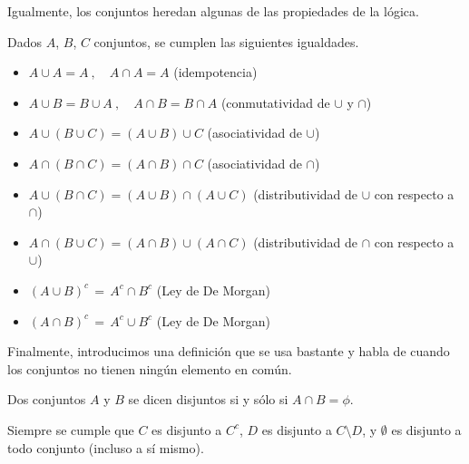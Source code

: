 Igualmente, los conjuntos heredan algunas de las propiedades de la lógica.

\begin{prop}
Dados $A$, $B$, $C$ conjuntos, se cumplen las siguientes igualdades.
\begin{itemize}

\item %
$ A \cup A = A\:, \quad A\cap A = A $\quad
(idempotencia)

\item %
$ A \cup B = B\cup A\:, \quad A\cap B = B \cap A$ \quad
(conmutatividad de $ \cup$ y $ \cap$)

\item $ A\cup (B\cup C) = (A\cup B) \cup C$ \quad (asociatividad de $ \cup$)

\item
$ A \cap (B\cap C) = (A\cap B) \cap C$ \quad (asociatividad de $ \cap$)

\item $ A\cup(B\cap C) = (A\cup B) \cap (A\cup C)$ 
(distributividad de $ \cup$ con respecto a $ \cap$)

\item
$ A\cap (B\cup C) = (A\cap B) \cup (A\cap C)$ 
(distributividad de $ \cap$ con respecto a $ \cup$)

\item
$ (A\cup B)^c\,=\,A^c \cap B^c$ \quad (Ley de De Morgan)

\item
$ (A\cap B)^c\,=\,A^c \cup B^c$ \quad (Ley de De Morgan)

\end{itemize}
\end{prop}

\medskip

Finalmente, introducimos una definición que se usa bastante y habla de cuando los conjuntos no tienen ningún elemento en común.

\medskip

\begin{defn}
Dos conjuntos $ A$ y $ B$ se dicen {disjuntos} si y s\'olo si
$ A \cap B = \phi$.
\end{defn}

\medskip

Siempre se cumple que $C$ es disjunto a $C^c$, $D$ es disjunto a $C\setminus D$, y $\emptyset$ es disjunto a todo conjunto (incluso a sí mismo).

